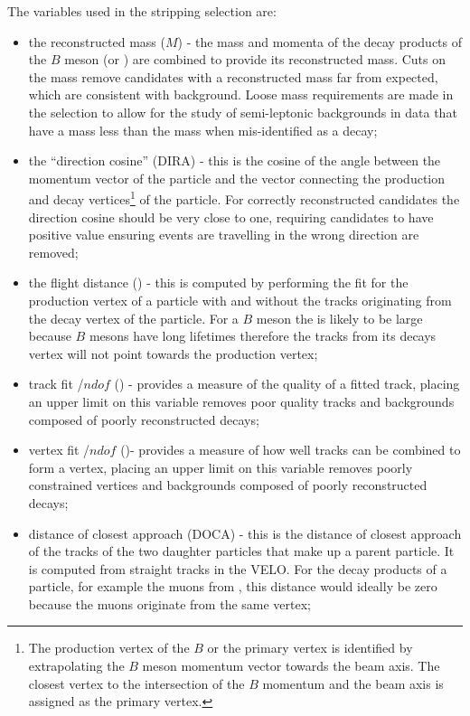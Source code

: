 The variables used in the stripping selection are:
\begin{itemize}
\item the reconstructed mass ($M$) - the mass and momenta of the decay products of the $B$ meson (or \jpsi) are combined to provide its reconstructed mass. Cuts on the mass remove candidates with a reconstructed mass far from expected, which are consistent with background. Loose mass requirements are made in the \bmumu selection to allow for the study of semi-leptonic backgrounds in data that have a mass less than the \bsd mass when mis-identified as a \bmumu decay;
\item the ``direction cosine'' (DIRA) - this is the cosine of the angle between the momentum vector of the particle and the vector connecting the production and decay vertices\footnote{The production vertex of the $B$ or the primary vertex is identified by extrapolating the $B$ meson momentum vector towards the beam axis. The closest vertex to the intersection of the $B$ momentum and the beam axis is assigned as the primary vertex.} of the particle. For correctly reconstructed candidates the direction cosine should be very close to one, requiring candidates to have positive value ensuring events are travelling in the wrong direction are removed;
\item the flight distance \chisqd (\chiFD) - this is computed by performing the fit for the production vertex of a particle with and without the tracks originating from the decay vertex of the particle. For a $B$ meson the \chiFD is likely to be large because $B$ mesons have long lifetimes therefore the tracks from its decays vertex will not point towards the production vertex;
\item track fit \chisqd/$ndof$ (\chitrk) - provides a measure of the quality of a fitted track, placing an upper limit on this variable removes poor quality tracks and backgrounds composed of poorly reconstructed decays;
\item vertex fit \chisqd/$ndof$ (\chivtx)- provides a measure of how well tracks can be combined to form a vertex, placing an upper limit on this variable removes poorly constrained vertices and backgrounds composed of poorly reconstructed decays;
\item distance of closest approach (DOCA) - this is the distance of closest approach of the tracks of the two daughter particles that make up a parent particle. It is computed from straight tracks in the VELO. For the decay products of a particle, for example the muons from \bmumu, this distance would ideally be zero because the muons originate from the same vertex;

\end{itemize}
